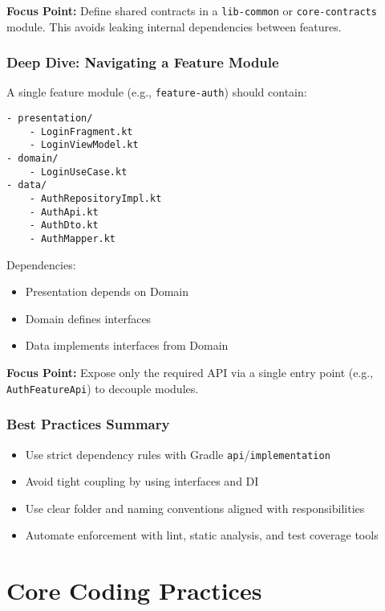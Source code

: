 \documentclass[a4paper,12pt]{article}
\begin{document}
\textbf{Focus Point:} Define shared contracts in a \texttt{lib-common} or \texttt{core-contracts} module. This avoids leaking internal dependencies between features.

\subsubsection{Deep Dive: Navigating a Feature Module}

A single feature module (e.g., \texttt{feature-auth}) should contain:

\begin{verbatim}
- presentation/
    - LoginFragment.kt
    - LoginViewModel.kt
- domain/
    - LoginUseCase.kt
- data/
    - AuthRepositoryImpl.kt
    - AuthApi.kt
    - AuthDto.kt
    - AuthMapper.kt
\end{verbatim}

Dependencies:

\begin{itemize}
  \item Presentation depends on Domain
  \item Domain defines interfaces
  \item Data implements interfaces from Domain
\end{itemize}

\textbf{Focus Point:} Expose only the required API via a single entry point (e.g., \texttt{AuthFeatureApi}) to decouple modules.

\subsubsection{Best Practices Summary}

\begin{itemize}
  \item Use strict dependency rules with Gradle \texttt{api}/\texttt{implementation}
  \item Avoid tight coupling by using interfaces and DI
  \item Use clear folder and naming conventions aligned with responsibilities
  \item Automate enforcement with lint, static analysis, and test coverage tools
\end{itemize}


\section{Core Coding Practices}
\end{document}
